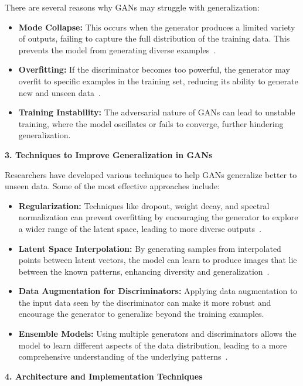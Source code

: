 There are several reasons why GANs may struggle with generalization:
\begin{itemize}
    \item \textbf{Mode Collapse:} This occurs when the generator produces a limited variety of outputs, failing to capture the full distribution of the training data. This prevents the model from generating diverse examples~\cite{wu2021modeling}.
    \item \textbf{Overfitting:} If the discriminator becomes too powerful, the generator may overfit to specific examples in the training set, reducing its ability to generate new and unseen data~\cite{adadi2021survey}.
    \item \textbf{Training Instability:} The adversarial nature of GANs can lead to unstable training, where the model oscillates or fails to converge, further hindering generalization.
\end{itemize}

\textbf{3. Techniques to Improve Generalization in GANs}

Researchers have developed various techniques to help GANs generalize better to unseen data. Some of the most effective approaches include:

\begin{itemize}
    \item \textbf{Regularization:} Techniques like dropout, weight decay, and spectral normalization can prevent overfitting by encouraging the generator to explore a wider range of the latent space, leading to more diverse outputs~\cite{li2024survey}.
    \item \textbf{Latent Space Interpolation:} By generating samples from interpolated points between latent vectors, the model can learn to produce images that lie between the known patterns, enhancing diversity and generalization~\cite{adadi2021survey}.
    \item \textbf{Data Augmentation for Discriminators:} Applying data augmentation to the input data seen by the discriminator can make it more robust and encourage the generator to generalize beyond the training examples.
    \item \textbf{Ensemble Models:} Using multiple generators and discriminators allows the model to learn different aspects of the data distribution, leading to a more comprehensive understanding of the underlying patterns~\cite{pan2019recent}.
\end{itemize}

\textbf{4. Architecture and Implementation Techniques}

